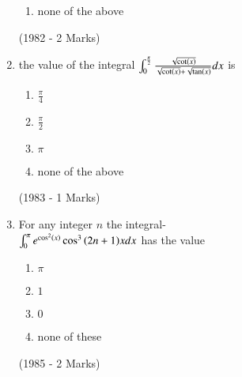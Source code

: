 \documentclass[journal]{IEEEtran}
\begin{document}
\begin{enumerate}
\begin{enumerate}
			\item none of the above
		        \end{enumerate}
		\hfill{(1982 - 2 Marks)}
	\item the value of the integral $\int_0^{\frac{\pi}{2}} \frac{\sqrt{\cot\left(x\right)}}{\sqrt{\cot\left(x\right)}+\sqrt{\tan\left(x\right)}}dx$ is 
	                \begin{enumerate}
			\item $\frac{\pi}{4}$
		\item$\frac{\pi}{2}$
			\item$\pi$
		\item none of the above
		         \end{enumerate}
		\hfill{(1983 - 1 Marks)}
	\item For any integer $n$ the integral-\\
		$\int_0^{\pi} e^{\cos^2 \left(x\right)} \cos ^3 {\left(2n+1\right)}xdx$ has the value
                        \begin{enumerate}
			\item	$\pi$
			\item $1$
			\item $0$
			\item none of these
		        \end{enumerate}
		\hfill{(1985 - 2 Marks)}
\end{enumerate}
\end{document}
